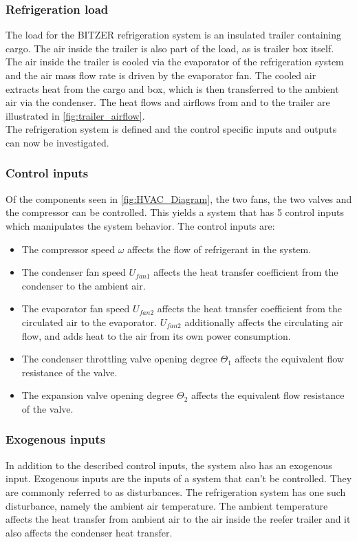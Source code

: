 \subsubsection{Refrigeration load}
The load for the BITZER refrigeration system is an insulated trailer containing cargo. The air inside the trailer is also part of the load, as is trailer box itself. The air inside the trailer is cooled via the evaporator of the refrigeration system and the air mass flow rate is driven by the evaporator fan. The cooled air extracts heat from the cargo and box, which is then transferred to the ambient air via the condenser. The heat flows and airflows from and to the trailer are illustrated in \cref{fig:trailer_airflow}.\\
The refrigeration system is defined and the control specific inputs and outputs can now be investigated.\\

\subsubsection{Control inputs}
Of the components seen in \cref{fig:HVAC_Diagram}, the two fans, the two valves and the compressor can be controlled. This yields a system that has 5 control inputs which manipulates the system behavior. The control inputs are:
\begin{itemize}
	\item The compressor speed $ \omega $ affects the flow of refrigerant in the system.
	\item The condenser fan speed $ U_{fan1} $ affects the heat transfer coefficient from the condenser to the ambient air.
	\item The evaporator fan speed  $ U_{fan2} $ affects the heat transfer coefficient from the circulated air to the evaporator. $ U_{fan2} $ additionally affects the circulating air flow, and adds heat to the air from its own power consumption.
	\item The condenser throttling valve opening degree $ \Theta_1 $ affects the equivalent flow resistance of the valve.
	\item The expansion valve opening degree $ \Theta_2 $ affects the equivalent flow resistance of the valve.
\end{itemize}

\subsubsection{Exogenous inputs}
In addition to the described control inputs, the system also has an exogenous input. 
Exogenous inputs are the inputs of a system that can't be controlled. They are commonly referred to as disturbances. The refrigeration system has one such disturbance, namely the ambient air temperature. The ambient temperature affects the heat transfer from ambient air to the air inside the reefer trailer and it also affects the condenser heat transfer.

